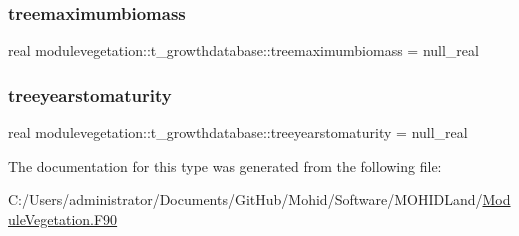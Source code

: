 \subsubsection{\texorpdfstring{treemaximumbiomass}{treemaximumbiomass}}
{\footnotesize\ttfamily real modulevegetation\+::t\+\_\+growthdatabase\+::treemaximumbiomass = null\+\_\+real\hspace{0.3cm}{\ttfamily [private]}}

\mbox{\label{structmodulevegetation_1_1t__growthdatabase_a51278935761ec89c4712f3416b037b89}} 
\subsubsection{\texorpdfstring{treeyearstomaturity}{treeyearstomaturity}}
{\footnotesize\ttfamily real modulevegetation\+::t\+\_\+growthdatabase\+::treeyearstomaturity = null\+\_\+real\hspace{0.3cm}{\ttfamily [private]}}



The documentation for this type was generated from the following file\+:\begin{DoxyCompactItemize}
\item 
C\+:/\+Users/administrator/\+Documents/\+Git\+Hub/\+Mohid/\+Software/\+M\+O\+H\+I\+D\+Land/\mbox{\hyperlink{_module_vegetation_8_f90}{Module\+Vegetation.\+F90}}\end{DoxyCompactItemize}
